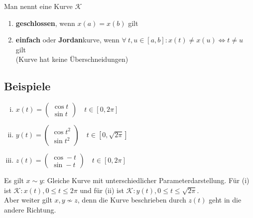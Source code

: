 \documentclass[11pt,a4paper]{book}
\newcommand{\1}    	{\mathbbm{1}}
\newcommand{\Kurve}	{{\mathcal{K}}}
\begin{document}
\noindent
Man nennt eine Kurve \(\Kurve\)
\begin{enumerate}
	\item \textbf{geschlossen}, wenn \(x(a) = x(b)\) gilt
	\item \textbf{einfach} oder \textbf{Jordan}kurve, wenn \(\forall~ t,u \in [a,b] : x(t) \neq x(u) \Leftrightarrow t \neq u\) gilt\\
	(Kurve hat keine Überschneidungen)
\end{enumerate}

\subsection{Beispiele}
\begin{enumerate}[(i)]
	\item \( x(t) = \left( \begin{array}{c}
		\cos t \\
		\sin t	
	\end{array} \right) \quad t \in [0,2\pi] \)
	\item \( y(t) = \left( \begin{array}{c}
		\cos t^2 \\
		\sin t^2	
	\end{array} \right) \quad t \in [0,\sqrt{2\pi}] \)
	\item \( z(t) = \left( \begin{array}{c}
		\cos -t \\
		\sin -t	
	\end{array} \right) \quad t \in [0,2\pi] \)
\end{enumerate}
Es gilt \(x \sim y\): Gleiche Kurve mit unterschiedlicher Parameterdarstellung. Für (i) ist \(\Kurve : x(t), 0 \leqslant t \leqslant 2\pi\) und für (ii) ist \(\Kurve : y(t), 0 \leqslant t \leqslant \sqrt{2\pi}\).\\
Aber weiter gilt \(x,y \not\sim z\), denn die Kurve beschrieben durch \(z(t)\) geht in die andere Richtung.
\end{document}
